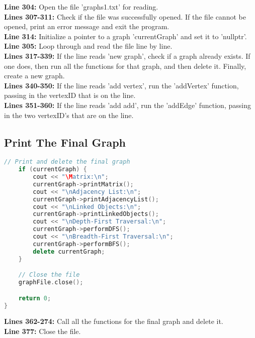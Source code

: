 \documentclass[letterpaper, 10pt,DIV=13]{scrartcl}
\numberwithin{equation}{section} %
\numberwithin{figure}{section} %
\numberwithin{table}{section} %
\begin{document}
\textbf{Line 304:} Open the file 'graphs1.txt' for reading. \\
\textbf{Lines 307-311:} Check if the file was successfully opened. If the file cannot be opened, print an error message and exit the program. \\
\textbf{Line 314:} Initialize a pointer to a graph 'currentGraph' and set it to 'nullptr'. \\
\textbf{Line 305:} Loop through and read the file line by line. \\
\textbf{Lines 317-339:} If the line reads 'new graph', check if a graph already exists. If one does, then run all the functions for that graph, and then delete it. Finally, create a new graph. \\
\textbf{Lines 340-350:} If the line reads 'add vertex', run the 'addVertex' function, passing in the vertexID that is on the line. \\
\textbf{Lines 351-360:} If the line reads 'add add', run the 'addEdge' function, passing in the two vertexID's that are on the line. \\


\subsection{Print The Final Graph}
\begin{linenumbers}
\begin{lstlisting}[language=C++, caption={Read 'graphs1.txt' and Call The Graph Functions}, label={code:example}]
    // Print and delete the final graph
    if (currentGraph) {
        cout << "\Matrix:\n";
        currentGraph->printMatrix();
        cout << "\nAdjacency List:\n";
        currentGraph->printAdjacencyList();
        cout << "\nLinked Objects:\n";
        currentGraph->printLinkedObjects();
        cout << "\nDepth-First Traversal:\n";
        currentGraph->performDFS();
        cout << "\nBreadth-First Traversal:\n";
        currentGraph->performBFS();
        delete currentGraph;
    }

    // Close the file
    graphFile.close();

    return 0;
}

\end{lstlisting}
\end{linenumbers}
\nolinenumbers

\textbf{Lines 362-274:} Call all the functions for the final graph and delete it. \\
\textbf{Line 377:} Close the file. \\
\end{document}
